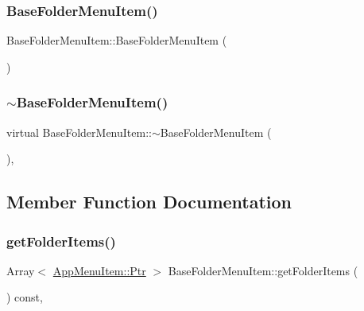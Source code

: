 \subsubsection{\texorpdfstring{Base\+Folder\+Menu\+Item()}{BaseFolderMenuItem()}}
{\footnotesize\ttfamily Base\+Folder\+Menu\+Item\+::\+Base\+Folder\+Menu\+Item (\begin{DoxyParamCaption}{ }\end{DoxyParamCaption})\hspace{0.3cm}{\ttfamily [inline]}}

\mbox{\label{classBaseFolderMenuItem_ad1eab257ee453b537644fb3b1478a6cd}} 
\subsubsection{\texorpdfstring{$\sim$\+Base\+Folder\+Menu\+Item()}{~BaseFolderMenuItem()}}
{\footnotesize\ttfamily virtual Base\+Folder\+Menu\+Item\+::$\sim$\+Base\+Folder\+Menu\+Item (\begin{DoxyParamCaption}{ }\end{DoxyParamCaption})\hspace{0.3cm}{\ttfamily [inline]}, {\ttfamily [virtual]}}



\subsection{Member Function Documentation}
\mbox{\label{classBaseFolderMenuItem_aeb33a4ceb17469daa82de80a44a2e862}} 
\subsubsection{\texorpdfstring{get\+Folder\+Items()}{getFolderItems()}}
{\footnotesize\ttfamily Array$<$ \mbox{\hyperlink{classAppMenuItem_ab5f51c5d74f8df62b8862c0cc8126cb7}{App\+Menu\+Item\+::\+Ptr}} $>$ Base\+Folder\+Menu\+Item\+::get\+Folder\+Items (\begin{DoxyParamCaption}{ }\end{DoxyParamCaption}) const\hspace{0.3cm}{\ttfamily [override]}, {\ttfamily [virtual]}}

